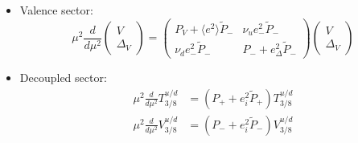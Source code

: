 \documentclass[a4paper,twoside]{article}
\begin{document}
\begin{itemize}
\item Valence sector:
\begin{equation*}
\mu^2\frac{d}{d\mu^2}
\begin{pmatrix}
V \\
\Delta_V
\end{pmatrix}
=
\begin{pmatrix}
P_V+\langle e^2\rangle \tilde{P}_{-} & \nu_ue^2_-\tilde{P}_{-}\\
 \nu_de^2_-\tilde{P}_{-}& P_-+e_\Delta^2 \tilde{P}_{-}
\end{pmatrix}
\begin{pmatrix}
V \\
\Delta_V
\end{pmatrix}
\end{equation*}
\item Decoupled sector:
\begin{align*}
\mu^2\frac{d}{d\mu^2}T^{u/d}_{3/8} & = (P_{+} + e_i^2 \tilde{P}_{+}) T^{u/d}_{3/8} \\
\mu^2\frac{d}{d\mu^2}V^{u/d}_{3/8} & = (P_{-} + e_i^2 \tilde{P}_{-} )V^{u/d}_{3/8}
\end{align*}

\end{itemize}
\end{document}
